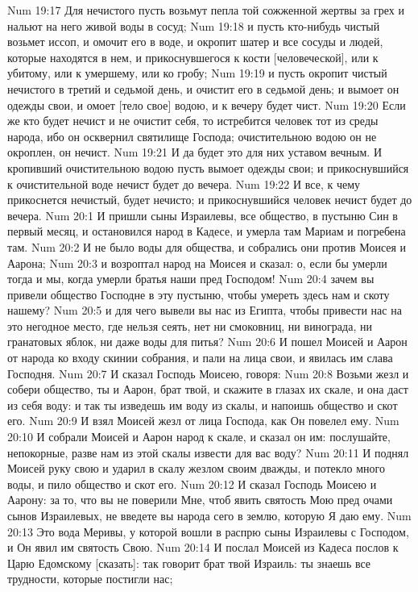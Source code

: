 Num 19:17  Для нечистого пусть возьмут пепла той сожженной жертвы за грех и нальют на него живой воды в сосуд;
Num 19:18  и пусть кто-нибудь чистый возьмет иссоп, и омочит его в воде, и окропит шатер и все сосуды и людей, которые находятся в нем, и прикоснувшегося к кости [человеческой], или к убитому, или к умершему, или ко гробу;
Num 19:19  и пусть окропит чистый нечистого в третий и седьмой день, и очистит его в седьмой день; и вымоет он одежды свои, и омоет [тело свое] водою, и к вечеру будет чист.
Num 19:20  Если же кто будет нечист и не очистит себя, то истребится человек тот из среды народа, ибо он осквернил святилище Господа; очистительною водою он не окроплен, он нечист.
Num 19:21  И да будет это для них уставом вечным. И кропивший очистительною водою пусть вымоет одежды свои; и прикоснувшийся к очистительной воде нечист будет до вечера.
Num 19:22  И все, к чему прикоснется нечистый, будет нечисто; и прикоснувшийся человек нечист будет до вечера.
Num 20:1  И пришли сыны Израилевы, все общество, в пустыню Син в первый месяц, и остановился народ в Кадесе, и умерла там Мариам и погребена там.
Num 20:2  И не было воды для общества, и собрались они против Моисея и Аарона;
Num 20:3  и возроптал народ на Моисея и сказал: о, если бы умерли тогда и мы, когда умерли братья наши пред Господом!
Num 20:4  зачем вы привели общество Господне в эту пустыню, чтобы умереть здесь нам и скоту нашему?
Num 20:5  и для чего вывели вы нас из Египта, чтобы привести нас на это негодное место, где нельзя сеять, нет ни смоковниц, ни винограда, ни гранатовых яблок, ни даже воды для питья?
Num 20:6  И пошел Моисей и Аарон от народа ко входу скинии собрания, и пали на лица свои, и явилась им слава Господня.
Num 20:7  И сказал Господь Моисею, говоря:
Num 20:8  Возьми жезл и собери общество, ты и Аарон, брат твой, и скажите в глазах их скале, и она даст из себя воду: и так ты изведешь им воду из скалы, и напоишь общество и скот его.
Num 20:9  И взял Моисей жезл от лица Господа, как Он повелел ему.
Num 20:10  И собрали Моисей и Аарон народ к скале, и сказал он им: послушайте, непокорные, разве нам из этой скалы извести для вас воду?
Num 20:11  И поднял Моисей руку свою и ударил в скалу жезлом своим дважды, и потекло много воды, и пило общество и скот его.
Num 20:12  И сказал Господь Моисею и Аарону: за то, что вы не поверили Мне, чтоб явить святость Мою пред очами сынов Израилевых, не введете вы народа сего в землю, которую Я даю ему.
Num 20:13  Это вода Меривы, у которой вошли в распрю сыны Израилевы с Господом, и Он явил им святость Свою.
Num 20:14  И послал Моисей из Кадеса послов к Царю Едомскому [сказать]: так говорит брат твой Израиль: ты знаешь все трудности, которые постигли нас;
